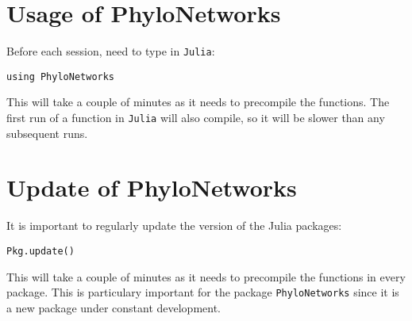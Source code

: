 \documentclass[12pt]{article}
\begin{document}
\section{Usage of PhyloNetworks}
Before each session, need to type in \texttt{Julia}:

\begin{lstlisting}
using PhyloNetworks
\end{lstlisting}

This will take a couple of minutes as it needs to precompile the
functions.  The first run of a function in \texttt{Julia} will also
compile, so it will be slower than any subsequent runs.

\section{Update of PhyloNetworks}
It is important to regularly update the version of the Julia packages:

\begin{lstlisting}
Pkg.update()
\end{lstlisting}

This will take a couple of minutes as it needs to precompile the
functions in every package. This is particulary important for the
package \texttt{PhyloNetworks} since it is a new package under constant
development.
\end{document}
